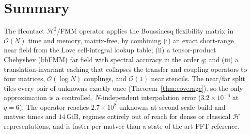 \documentclass[11pt,a4paper]{article}
\newcommand{\Order}{\mathcal{O}}
\newcommand{\Htwo}{\mathcal{H}^2}
\newcommand{\Hmat}{\mathcal{H}}
\theoremstyle{definition}
\theoremstyle{remark}
\begin{document}
\section*{Summary}
The Hcontact $\Htwo$/FMM operator applies the Boussinesq flexibility matrix in
$\Order(N)$ time and memory, matrix-free, by combining (i) an exact short-range
near field from the Love cell-integral lookup table; (ii) a tensor-product
Chebyshev (bbFMM) far field with spectral accuracy in the order $q$; and (iii) a
translation-invariant caching that collapses the transfer and coupling operators
to four matrices, $\Order(\log N)$ couplings, and $\Order(1)$ near stencils. The
near/far split tiles every pair of unknowns exactly once
(Theorem~\ref{thm:coverage}), so the only approximation is a controlled,
$N$-independent interpolation error ($3.2\times10^{-6}$ at $q=6$). The operator
reaches $2.7\times10^8$ unknowns at second-scale build and matvec times and
$14$\,GiB, regimes entirely out of reach for dense or classical $\Hmat$
representations, and is faster per matvec than a state-of-the-art FFT reference.



\end{document}
